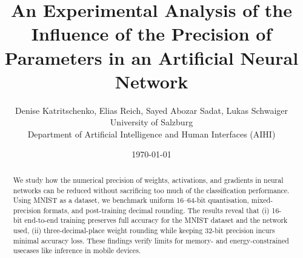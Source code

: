 \documentclass[11pt]{article}
\title{An Experimental Analysis of the Influence of the Precision of Parameters in an Artificial Neural Network}
\author{Denise Katritschenko, Elias Reich, Sayed Abozar Sadat, Lukas Schwaiger\\
	\small University of Salzburg\\
	\small Department of Artificial Intelligence and Human Interfaces (AIHI) }
\date{\today}
\begin{document}
\maketitle

\begin{abstract}
	We study how the numerical precision of weights, activations, and gradients in neural networks can be reduced without sacrificing too much of the classification performance. Using MNIST as a dataset, we benchmark uniform 16–64-bit quantisation, mixed-precision formats, and post-training decimal rounding. The results reveal that (i) 16-bit end-to-end training preserves full accuracy for the MNIST dataset and the network used, (ii) three-decimal-place weight rounding while keeping 32-bit precision incurs minimal accuracy loss. These findings verify limits for memory- and energy-constrained usecases like inference in mobile devices.
\end{abstract}
\end{document}
